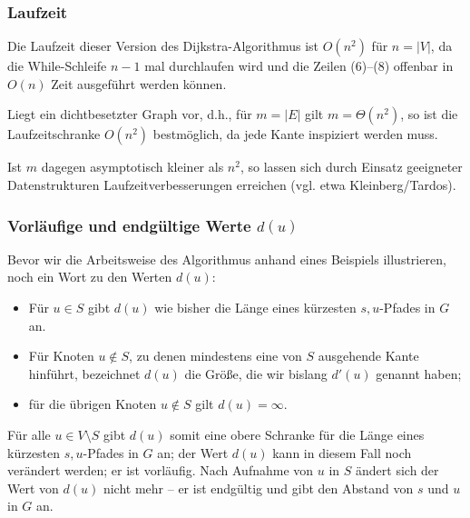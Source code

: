 \documentclass[smaller]{beamer}
\begin{document}
\begin{frame}
\frametitle{Laufzeit}
Die Laufzeit dieser Version des Dijkstra-Algorithmus ist \alert{$O(n^2)$} für $n = |V|$, da die While-Schleife $n-1$ mal durchlaufen wird und die Zeilen (6)--(8) offenbar in $O(n)$ Zeit ausgeführt werden können. \\ \vspace*{0.2cm}

Liegt ein dichtbesetzter Graph vor, d.h., für $m=|E|$ gilt $m = \Theta(n^2)$, so ist die Laufzeitschranke $O(n^2)$ bestmöglich, da jede Kante inspiziert werden muss. \\ \vspace*{0.2cm}

Ist $m$ dagegen asymptotisch kleiner als $n^2$, so lassen sich durch Einsatz geeigneter Datenstrukturen Laufzeitverbesserungen erreichen (vgl. etwa Kleinberg/Tardos).
\end{frame}

\begin{frame}
\frametitle{Vorläufige und endgültige Werte $d(u)$}
Bevor wir die Arbeitsweise des Algorithmus anhand eines Beispiels illustrieren, noch ein Wort zu den Werten $d(u)$: 
\begin{itemize}
\item Für $u \in S$ gibt $d(u)$ wie bisher die Länge eines kürzesten $s,u$-Pfades in $G$ an. 
\item Für Knoten $u \notin S$, zu denen mindestens eine von $S$ ausgehende Kante hinführt, bezeichnet $d(u)$ die Größe, die wir bislang $d'(u)$ genannt haben;
\item für die übrigen Knoten $u \notin S$ gilt $d(u) = \infty$.
\end{itemize}  \vspace*{0.2cm}
Für alle $u \in V \setminus S$ gibt $d(u)$ somit eine \alert{obere Schranke} für die Länge eines kürzesten $s,u$-Pfades in $G$ an; der Wert $d(u)$ kann in diesem Fall noch verändert werden; er ist \alert{vorläufig}. Nach Aufnahme von $u$ in $S$ ändert sich der Wert von $d(u)$ nicht mehr -- er ist \alert{endgültig} und gibt den Abstand von $s$ und $u$ in $G$ an.
\end{frame}
\end{document}
